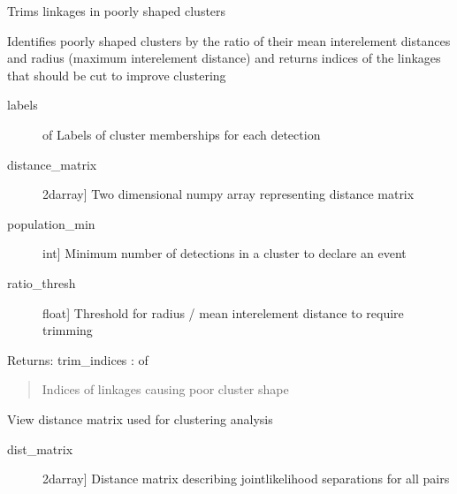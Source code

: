 \documentclass[letterpaper,10pt,english]{sphinxmanual}
\begin{document}
\begin{fulllineitems}
\label{\detokenize{infrapy.association:infrapy.association.hjl.trim_clusters}}
Trims linkages in poorly shaped clusters

Identifies poorly shaped clusters by the ratio of their mean inter\sphinxhyphen{}element
distances and radius (maximum inter\sphinxhyphen{}element distance) and returns indices
of the linkages that should be cut to improve clustering
\begin{description}
\item[{labels}] \leavevmode{[} of \sphinxcode{\sphinxupquote{int}}{]}
Labels of cluster memberships for each detection

\item[{distance\_matrix}] \leavevmode{[}2darray{]}
Two dimensional numpy array representing distance matrix

\item[{population\_min}] \leavevmode{[}int{]}
Minimum number of detections in a cluster to declare an event

\item[{ratio\_thresh}] \leavevmode{[}float{]}
Threshold for radius / mean inter\sphinxhyphen{}element distance to require trimming

\end{description}

Returns:
trim\_indices :  of 
\begin{quote}

Indices of linkages causing poor cluster shape
\end{quote}

\end{fulllineitems}


\begin{fulllineitems}
\label{\detokenize{infrapy.association:infrapy.association.hjl.view_distance_matrix}}
View distance matrix used for clustering analysis
\begin{description}
\item[{dist\_matrix}] \leavevmode{[}2darray{]}
Distance matrix describing joint\sphinxhyphen{}likelihood separations for all pairs

\end{description}

\end{fulllineitems}
\end{document}
